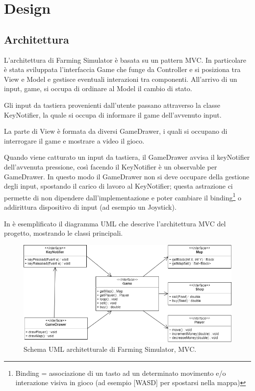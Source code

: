 \documentclass[a4paper,12pt]{report}
\begin{document}
\chapter{Design}

\section{Architettura}

L’architettura di Farming Simulator è basata su un pattern MVC. In particolare è stata sviluppata l’interfaccia Game che funge da Controller e si posiziona tra View e Model e gestisce eventuali interazioni tra componenti. All’arrivo di un input, game, si occupa di ordinare al Model il cambio di stato.

\hfill\break
Gli input da tastiera provenienti dall’utente passano attraverso la classe KeyNotifier, la quale si occupa di informare il game dell’avvenuto input. 

\hfill\break
La parte di View è formata da diversi GameDrawer, i quali si occupano di interrogare il game e mostrare a video il gioco.

Quando viene catturato un input da tastiera, il GameDrawer avvisa il keyNotifier dell’avvenuta pressione, così facendo il KeyNotifier è un observable per GameDrawer. In questo modo il GameDrawer non si deve occupare della gestione degli input, spostando il carico di lavoro al KeyNotifier; questa astrazione ci permette di non dipendere dall'implementazione e poter cambiare il binding\footnote[1]{Binding = associazione di un tasto ad un determinato movimento e/o interazione visiva in gioco (ad esempio [WASD] per spostarsi nella mappa)} o addirittura dispositivo di input (ad esempio un Joystick). 

\hfill\break
In  è esemplificato il diagramma UML che descrive l'architettura MVC del progetto, mostrando le classi principali.

\hfill\break
\begin{figure}[!htb]
\centerline{\includegraphics[scale=.65]{img/UML_2-1.png}}
\caption{Schema UML architetturale di Farming Simulator, MVC.}
\label{img:MVC}
\end{figure}
\end{document}
